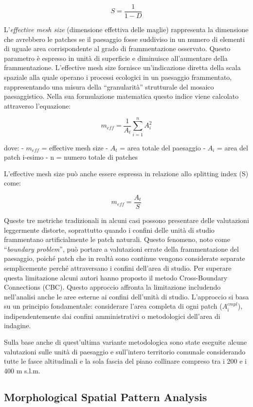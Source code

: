 \documentclass[
  a4paper,
]{book}
\begin{document}
\[S=\frac{1}{1-D}\]

L'\emph{effective mesh size} (dimensione effettiva delle maglie) rappresenta la dimensione che avrebbero le patches se il paesaggio fosse suddiviso in un numero di elementi di uguale area corrispondente al grado di frammentazione osservato.
Questo parametro è espresso in unità di superficie e diminuisce all'aumentare della frammentazione.
L'effective mesh size fornisce un'indicazione diretta della scala spaziale alla quale operano i processi ecologici in un paesaggio frammentato, rappresentando una misura della ``granularità'' strutturale del mosaico paesaggistico.
Nella sua formulazione matematica questo indice viene calcolato attraverso l'equazione:

\[m_{eff} = \frac{1}{A_t} \sum_{i=1}^{n} A_i^2\]

dove: - \(m_{eff}\) = effective mesh size - \(A_t\) = area totale del paesaggio - \(A_i\) = area del patch i-esimo - n = numero totale di patches

L'effective mesh size può anche essere espressa in relazione allo splitting index (S) come:

\[m_{eff} = \frac{A_t}{S}\]

Queste tre metriche tradizionali in alcuni casi possono presentare delle valutazioni leggermente distorte, soprattutto quando i confini delle unità di studio frammentano artificialmente le patch naturali.
Questo fenomeno, noto come ``\emph{boundary problem}'', può portare a valutazioni errate della frammentazione del paesaggio, poiché patch che in realtà sono continue vengono considerate separate semplicemente perché attraversano i confini dell'area di studio.
Per superare questa limitazione alcuni autori \citep{moserModificationEffectiveMesh2007} hanno proposto il metodo Cross-Boundary Connections (CBC).
Questo approccio affronta la limitazione includendo nell'analisi anche le aree esterne ai confini dell'unità di studio.
L'approccio si basa su un principio fondamentale: considerare l'area completa di ogni patch (\(A^{cmpl}_i\)), indipendentemente dai confini amministrativi o metodologici dell'area di indagine.

Sulla base anche di quest'ultima variante metodologica sono state eseguite alcune valutazioni sulle unità di paesaggio e sull'intero territorio comunale considerando tutte le fasce altitudinali e la sola fascia del piano collinare compreso tra i 200 e i 400 m s.l.m.

\subsection{Morphological Spatial Pattern Analysis}\label{morphological-spatial-pattern-analysis}
\end{document}
